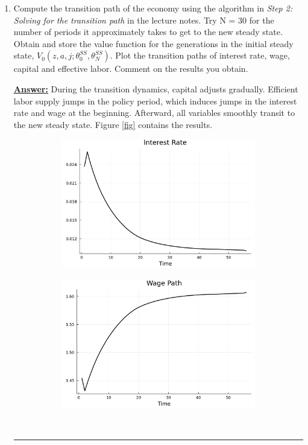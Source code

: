 \documentclass{article} %
\theoremstyle{definition}
\newenvironment{solution}[1][Answer]{\begin{singlespace}\underline{\textbf{#1:}}\quad }{\ \rule{0.3em}{0.3em}\end{singlespace}} %
\begin{document}
\begin{enumerate}
\item  Compute the transition path of the economy using the algorithm in \textit{Step 2: Solving for the transition path} in the lecture notes. Try N = 30 for the
  number of periods it approximately takes to get to the new steady state. Obtain and store the value function for the generations in the initial steady state, $ V_0(z,a,j; \theta_0^{SS}, \theta_N^{SS}) $. Plot the transition paths of interest rate, wage, capital and effective labor. Comment on the results you obtain.
  \begin{solution}
    During the transition dynamics, capital adjusts gradually. Efficient labor supply jumps in the policy period, which induces jumps in the interest rate and wage at the beginning. Afterward, all variables smoothly transit to the new steady state. Figure \ref{fig} contains the results.
    \begin{figure}
      \centering
      \begin{subfigure}[b]{0.475\textwidth}
        \centering
        \includegraphics[width=\textwidth]{Figures/interest_rate.pdf}
      \end{subfigure}
      \hfill
      \begin{subfigure}[b]{0.475\textwidth}  
        \centering 
        \includegraphics[width=\textwidth]{Figures/wage.pdf}

\end{subfigure}
\end{figure}
\end{solution}
\end{enumerate}
\end{document}
